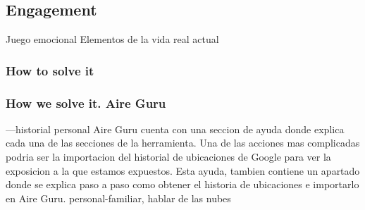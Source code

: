 \subsection{Engagement}

Juego emocional
Elementos de la vida real
actual

\subsubsection{How to solve it} 


\subsubsection{How we solve it. Aire Guru} 
---historial personal
Aire Guru cuenta con una seccion de ayuda  donde explica cada una de las secciones de la herramienta. Una de las acciones mas complicadas
podria ser la importacion del historial de ubicaciones de Google para ver la exposicion a la que estamos expuestos. Esta ayuda, tambien 
contiene un apartado donde se explica paso a paso como obtener el historia de ubicaciones e importarlo en Aire Guru.
personal-familiar, hablar de las nubes
\begin{itemize}
    \done
    \crossed
    
\end{itemize}
\newpage